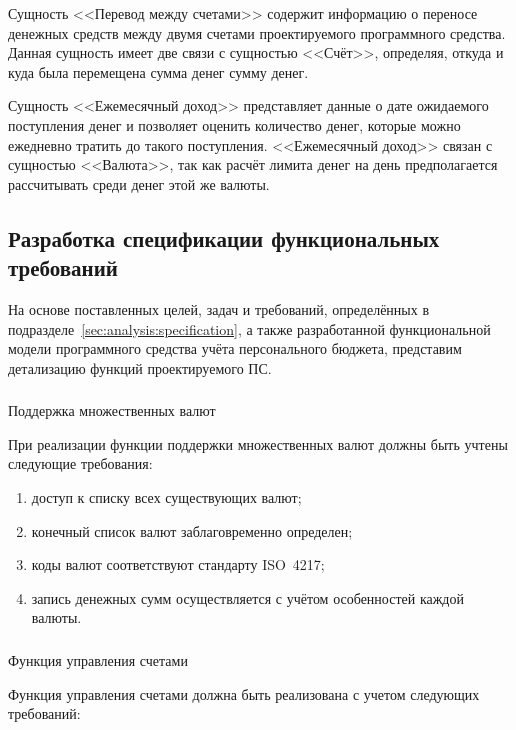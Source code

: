 Сущность <<Перевод между счетами>> содержит информацию о переносе денежных средств между двумя счетами проектируемого программного средства.
Данная сущность имеет две связи с сущностью <<Счёт>>, определяя, откуда и куда была перемещена сумма денег сумму денег.

Сущность <<Ежемесячный доход>> представляет данные о дате ожидаемого поступления денег и позволяет оценить количество денег, которые можно ежедневно тратить до такого поступления.
<<Ежемесячный доход>> связан с сущностью <<Валюта>>, так как расчёт лимита денег на день предполагается рассчитывать среди денег этой же валюты.

\subsection{Разработка спецификации функциональных требований}
\label{sec:domain:specification}

На основе поставленных целей, задач и требований, определённых в подразделе~\ref{sec:analysis:specification}, а также разработанной функциональной модели программного средства учёта персонального бюджета, представим детализацию функций проектируемого ПС.

\subsubsection{} Поддержка множественных валют
\label{sec:domain:specification:currencies}

При реализации функции поддержки множественных валют должны быть учтены следующие требования:

\begin{enumerate}
    \item доступ к списку всех существующих валют;
    \item конечный список валют заблаговременно определен;
    \item коды валют соответствуют стандарту ISO~4217;
    \item запись денежных сумм осуществляется с учётом особенностей каждой валюты.
\end{enumerate}


\subsubsection{} Функция управления счетами
\label{sec:domain:specification:wallets}

Функция управления счетами должна быть реализована с учетом следующих требований:

